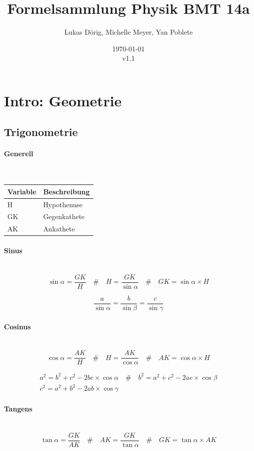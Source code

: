 \documentclass[a4paper,twoside,10pt]{article}
\title{Formelsammlung Physik BMT 14a}
\author{Lukas Dörig, Michelle Meyer, Yan Poblete}
\date{\today\\v1.1}
\newcommand{\lbparagraph}[1]{\paragraph{#1}\mbox{}\\}
\newcommand{\eqsp}[1]{\quad\#\quad}
\begin{document}
\maketitle

\tableofcontents

\pagebreak

\section*{Intro: Geometrie}

\subsection*{Trigonometrie}

\lbparagraph{Generell}

\begin{tabular}{l|l}
    Variable & Beschreibung \\
    \hline
    H & Hypothenuse \\
    GK & Gegenkathete \\
    AK & Ankathete
\end{tabular}

\lbparagraph{Sinus}

\begin{equation}
    \sin{\alpha} = \frac{GK}{H}
    \eqsp{}
    H = \frac{GK}{\sin{\alpha}}
    \eqsp{}
    GK = \sin{\alpha} \times H
\end{equation}

\begin{equation}
    \frac{a}{\sin{\alpha}} = \frac{b}{\sin{\beta}} = \frac{c}{\sin{\gamma}}
\end{equation}

\lbparagraph{Cosinus}

\begin{equation}
    \cos{\alpha} = \frac{AK}{H}
    \eqsp{}
    H = \frac{AK}{\cos{\alpha}}
    \eqsp{}
    AK = \cos{\alpha} \times H
\end{equation}

\begin{gather}
    a^2 = b^2 + c^2 - 2bc \times \cos{\alpha}
    \eqsp{}
    b^2 = a^2 + c^2 - 2ac \times \cos{\beta}
    \\
    c^2 = a^2 + b^2 - 2ab \times \cos{\gamma}
\end{gather}

\lbparagraph{Tangens}

\begin{equation}
    \tan{\alpha} = \frac{GK}{AK}
    \eqsp{}
    AK = \frac{GK}{\tan{\alpha}}
    \eqsp{}
    GK = \tan{\alpha} \times AK
\end{equation}
\end{document}
